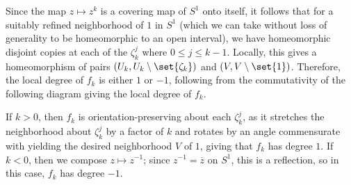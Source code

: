 \documentclass[10pt]{mypackage}
\begin{document}
\begin{solution}
  Since the map $z\mapsto z^{k}$ is a covering map of $S^1$ onto itself, it follows that for a suitably refined neighborhood of $1$ in $S^1$ (which we can take without loss of generality to be homeomorphic to an open interval), we have homeomorphic disjoint copies at each of the $\zeta_k^{j}$ where $0\leq j \leq k-1$. Locally, this gives a homeomorphism of pairs $\left( U_k,U_k\setminus\set{\zeta_k} \right)$ and $\left( V,V\setminus\set{1} \right)$. Therefore, the local degree of $f_k$ is either $1$ or $-1$, following from the commutativity of the following diagram giving the local degree of $f_k$.
  \begin{center}
  \end{center}
  If $k > 0$, then $f_k$ is orientation-preserving about each $\zeta_k^{j}$, as it stretches the neighborhood about $\zeta_k^{j}$ by a factor of $k$ and rotates by an angle commensurate with yielding the desired neighborhood $V$ of $1$, giving that $f_k$ has degree $1$. If $k < 0$, then we compose $z\mapsto z^{-1}$; since $z^{-1} = \overline{z}$ on $S^1$, this is a reflection, so in this case, $f_k$ has degree $-1$.
\end{solution}
\end{document}
